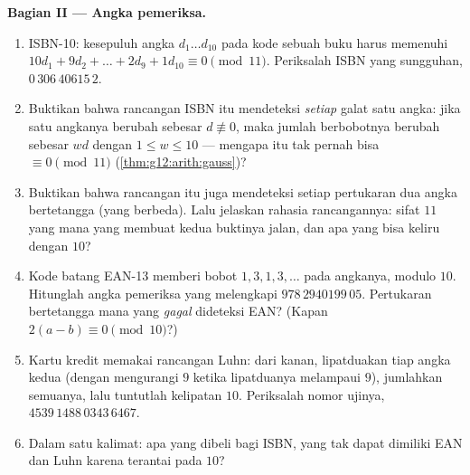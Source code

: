 \begin{problem}
\medskip
\noindent\textbf{Bagian II --- Angka pemeriksa.}
\begin{enumerate}[resume]
  \item ISBN-10: kesepuluh angka $d_1 \dots d_{10}$ pada kode
        sebuah buku harus memenuhi
        $10d_1 + 9d_2 + \dots + 2d_9 + 1d_{10} \equiv 0
        \pmod{11}$. Periksalah ISBN yang sungguhan,
        $0\,306\,40615\,2$.
  \item Buktikan bahwa rancangan ISBN itu mendeteksi \emph{setiap}
        galat satu angka: jika satu angkanya berubah sebesar
        $d \not\equiv 0$, maka jumlah berbobotnya berubah sebesar $w d$
        dengan $1 \leq w \leq 10$ --- mengapa itu tak pernah bisa
        $\equiv 0 \pmod{11}$
        (\cref{thm:g12:arith:gauss})?
  \item Buktikan bahwa rancangan itu juga mendeteksi setiap pertukaran dua
        angka bertetangga (yang berbeda). Lalu jelaskan rahasia
        rancangannya: sifat $11$ yang mana yang membuat kedua buktinya jalan,
        dan apa yang bisa keliru dengan  $10$?
  \item Kode batang EAN-13 memberi bobot $1, 3, 1, 3, \dots$ pada angkanya,
        modulo $10$. Hitunglah angka pemeriksa yang melengkapi
        $978\,2940199\,05$. Pertukaran bertetangga mana yang \emph{gagal}
        dideteksi EAN? (Kapan
        $2(a - b) \equiv 0 \pmod{10}$?)
  \item Kartu kredit memakai rancangan Luhn: dari kanan, lipatduakan
        tiap angka kedua (dengan mengurangi $9$ ketika lipatduanya
        melampaui $9$), jumlahkan semuanya, lalu tuntutlah kelipatan
        $10$. Periksalah nomor ujinya,
        $4539\,1488\,0343\,6467$.
  \item Dalam satu kalimat: apa yang dibeli   bagi ISBN,
        yang tak dapat dimiliki EAN dan Luhn karena terantai pada $10$?
\end{enumerate}


\end{problem}
